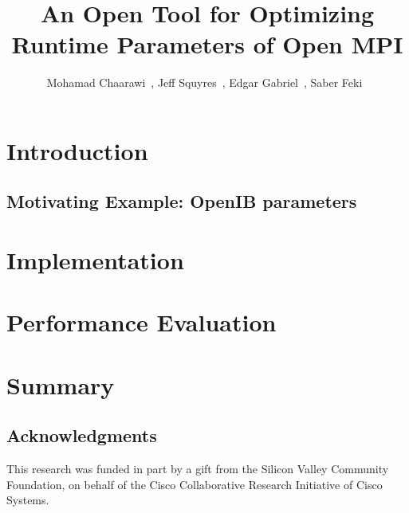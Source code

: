 \documentclass{llncs}
\begin{document}
\title{An Open Tool for Optimizing Runtime Parameters of Open MPI}

\author{
Mohamad Chaarawi~,
Jeff Squyres~,
Edgar Gabriel~,
Saber Feki~
}


\maketitle
\begin{abstract}

\end{abstract}

\section{Introduction}
\label{sec:intro}


\subsection{Motivating Example: OpenIB parameters}
\label{sec:mot}


\section{Implementation}
\label{sec:impl}


\section{Performance Evaluation}
\label{sec:eval}


\section{Summary}
\label{sec:summary}


\subsection*{Acknowledgments}
This research was funded in part by a gift from the Silicon Valley Community Foundation, on behalf of the Cisco Collaborative Research Initiative of Cisco Systems.



\noindent
\end{document}
